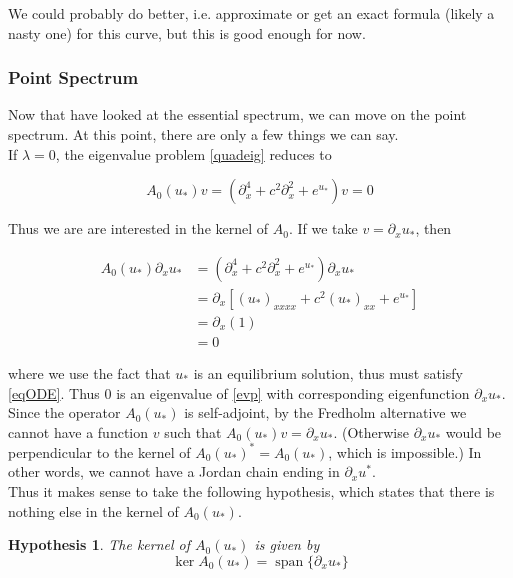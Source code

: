 \documentclass[12pt]{article}
\DeclareMathOperator{\spn}{span}
\newtheorem{hypothesis}{Hypothesis}
\begin{document}
We could probably do better, i.e. approximate or get an exact formula (likely a nasty one) for this curve, but this is good enough for now.

\subsubsection{Point Spectrum}

Now that have looked at the essential spectrum, we can move on the point spectrum. At this point, there are only a few things we can say.\\

If $\lambda = 0$, the eigenvalue problem \eqref{quadeig} reduces to

\begin{equation*}
A_0(u_*) v = (\partial_x^4 + c^2 \partial_x^2 + e^{u_*})v = 0
\end{equation*}

Thus we are are interested in the kernel of $A_0$. If we take $v = \partial_x u_*$, then

\begin{align*}
A_0(u_*) \partial_x u_* &= 
(\partial_x^4 + c^2 \partial_x^2 + e^{u_*})\partial_x u_* \\
&= \partial_x[(u_*)_{xxxx} + c^2 (u_*)_{xx} + e^{u_*}] \\
&= \partial_x(1) \\
&= 0
\end{align*}

where we use the fact that $u_*$ is an equilibrium solution, thus must satisfy \eqref{eqODE}. Thus 0 is an eigenvalue of \eqref{evp} with corresponding eigenfunction $\partial_x u_*$.\\

Since the operator $A_0(u_*)$ is self-adjoint, by the Fredholm alternative we cannot have a function $v$ such that $A_0(u_*) v = \partial_x u_*$. (Otherwise $\partial_x u_*$ would be perpendicular to the kernel of $A_0(u_*)^* = A_0(u_*)$, which is impossible.) In other words, we cannot have a Jordan chain ending in $\partial_x u^*$.\\

Thus it makes sense to take the following hypothesis, which states that there is nothing else in the kernel of $A_0(u_*)$.

\begin{hypothesis}\label{kerA0hyp}
The kernel of $A_0(u_*)$ is given by
\begin{equation}\label{kerA0}
\ker A_0(u_*) = \spn\{ \partial_x u_*\}
\end{equation}
\end{hypothesis}
\end{document}
